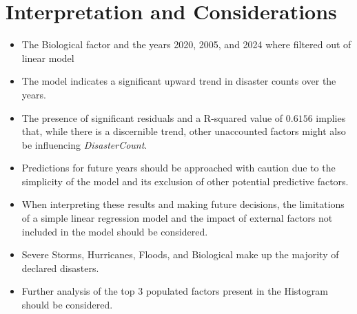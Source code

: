 \documentclass[12pt]{report}\usepackage[]{graphicx}\usepackage[]{xcolor}
\begin{document}
\section*{Interpretation and Considerations}
\begin{itemize}
    \item The Biological factor and the years 2020, 2005, and 2024 where filtered out of linear model
    \item The model indicates a significant upward trend in disaster counts over the years.
    \item The presence of significant residuals and a R-squared value of $0.6156$ implies that, while there is a discernible trend, other unaccounted factors might also be influencing \textit{DisasterCount}.
    \item Predictions for future years should be approached with caution due to the simplicity of the model and its exclusion of other potential predictive factors.
    \item When interpreting these results and making future decisions, the limitations of a simple linear regression model and the impact of external factors not included in the model should be considered.
    \item Severe Storms, Hurricanes, Floods, and Biological make up the majority of declared disasters.
    \item Further analysis of the top 3 populated factors present in the Histogram should be considered.
\end{itemize}
\end{document}
